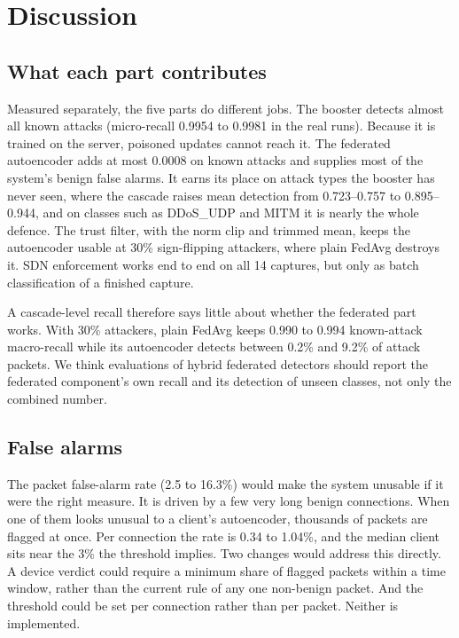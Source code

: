 \section{Discussion}
\label{sec:discussion}
\subsection{What each part contributes}
Measured separately, the five parts do different jobs. The booster detects almost all known attacks (micro-recall 0.9954 to 0.9981 in the real runs). Because it is trained on the server, poisoned updates cannot reach it. The federated autoencoder adds at most 0.0008 on known attacks and supplies most of the system's benign false alarms. It earns its place on attack types the booster has never seen, where the cascade raises mean detection from 0.723--0.757 to 0.895--0.944, and on classes such as DDoS\_UDP and MITM it is nearly the whole defence. The trust filter, with the norm clip and trimmed mean, keeps the autoencoder usable at 30\% sign-flipping attackers, where plain FedAvg destroys it. SDN enforcement works end to end on all 14 captures, but only as batch classification of a finished capture.

A cascade-level recall therefore says little about whether the federated part works. With 30\% attackers, plain FedAvg keeps 0.990 to 0.994 known-attack macro-recall while its autoencoder detects between 0.2\% and 9.2\% of attack packets. We think evaluations of hybrid federated detectors should report the federated component's own recall and its detection of unseen classes, not only the combined number.

\subsection{False alarms}
The packet false-alarm rate (2.5 to 16.3\%) would make the system unusable if it were the right measure. It is driven by a few very long benign connections. When one of them looks unusual to a client's autoencoder, thousands of packets are flagged at once. Per connection the rate is 0.34 to 1.04\%, and the median client sits near the 3\% the threshold implies. Two changes would address this directly. A device verdict could require a minimum share of flagged packets within a time window, rather than the current rule of any one non-benign packet. And the threshold could be set per connection rather than per packet. Neither is implemented.

